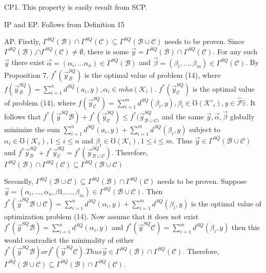 \documentclass[]{iosart2c}
\begin{document}
CP1. This property is easily result from SCP.

IP and EP. Follows from Definition 15

AP. Firstly, $\Gamma^{SQ}(\mathcal{B}) \cap \Gamma^{SQ}(\mathcal{C}) \subseteq \Gamma^{SQ}(\mathcal{B} \cup \mathcal{C})$ needs to be proven. Since $\Gamma^{SQ}(\mathcal{B})$,$\cap\Gamma^{SQ}(\mathcal{C}) \neq \emptyset$, there is some $\vec{y} = \Gamma^{SQ}(\mathcal{B}) \cap \Gamma^{SQ}(\mathcal{C})$. For any such $\vec{y}$ there exist $\vec{\alpha} = (\alpha_i, ... \alpha_n) \in \Gamma^{SQ}(\mathcal{B})$ and $\vec{\beta}= (\beta_i, ... , \beta_m) \in \Gamma^{SQ}(\mathcal{C})$. By Proposition 7, $f^*(\vec{y}^{SQ}_\mathcal{B})$ is the optimal value of problem (14), where $f(\vec{y}^{SQ}_\mathcal{B} ) = \sum^n_{i=1} d^{SQ}(a_i, y), \alpha_i \in mho(\mathcal{K}_i)$. $f^*(\vec{y}^{SQ}_\mathcal{C} )$ is the optimal value of problem (14), where $f (\vec{y}^{SQ}_\mathcal{C} ) = \sum^m_{i=1} d^{SQ}(\beta_i, y), \beta_i \in \mho(\mathcal{K}'_i), y \in \hat{\mathcal{P}} {\hat{\varepsilon}}$. It follows that $f^*(\vec{y}^{SQ} \mathcal{B} ) + f^*(\vec{y}^{SQ}_\mathcal{C} ) \le f^*(\vec{y}^{SQ}_{\mathcal{B}\cup\mathcal{C})}$ and the same $\vec{y}, \vec{\alpha}, \vec{\beta}$ globally minimize the sum $\sum^n_{i=1} d^{SQ}(a_i, y) +\sum^m_{i=1} d^{SQ}(\beta_i, y)$ subject to $\alpha_i \in \mho(\mathcal{K}_i), 1 \le i \le n$ and $\beta_i \in \mho(\mathcal{K}_i), 1 \le i \le m$. Thus $\vec{y} \in \Gamma^{SQ}(\mathcal{B} \cup \mathcal{C})$ and $f^*\vec{y}^{SQ}_\mathcal{B} + f^*\vec{y}^{SQ}_\mathcal{C} = f^*(\vec{y}^{SQ}_{\mathcal{B}\cup\mathcal{C}})$. Therefore, $\Gamma^{SQ}(\mathcal{B}) \cap \Gamma^{SQ}(\mathcal{C}) \subseteq \Gamma^{SQ}(\mathcal{B} \cup \mathcal{C})$

Secondly, $\Gamma^{SQ}(\mathcal{B} \cup \mathcal{C}) \subseteq \Gamma^{SQ}(\mathcal{B}) \cap \Gamma^{SQ}(\mathcal{C})$ needs to be proven. Suppose $\vec{y} = (\alpha_i, ..., \alpha_n, \beta1, ..., \beta_m) \in \Gamma^{SQ}(\mathcal{B} \cup \mathcal{C})$. Then $f^*(\vec{y}^{SQ}\mathcal{B}\cup\mathcal{C})=\sum^n_{i=1} d^{SQ} (\alpha_i, y) +\sum^m_{i=1} d^{SQ}(\beta_i, y)$ is the optimal value of optimization problem (14). Now assume that it does not exist $f^*(\vec{y}^{SQ}\mathcal{B} ) = \sum^n_{i=1} d^{SQ}(\alpha_i, y)$ and $f^*(\vec{y}^{SQ}\mathcal{C} ) = \sum^m_{i=1} d^{SQ}(\beta_i, y)$ then this would contradict the minimality of either $f^*(\vec{y}^{SQ}\mathcal{B} ) or f^*(\vec{y}^{SQ}\mathcal{C} ). Thus \vec{y} \in \Gamma^{SQ}(\mathcal{B}) \cap \Gamma^{SQ}(\mathcal{C})$. Therefore, $\Gamma^{SQ}(\mathcal{B} \cup \mathcal{C}) \subseteq \Gamma^{SQ}(\mathcal{B}) \cap \Gamma^{SQ}(\mathcal{C})$.
\end{document}
